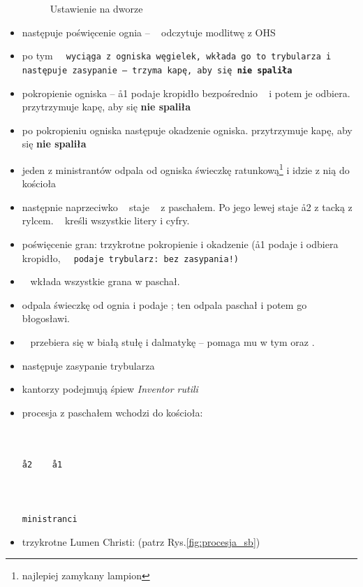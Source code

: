 \begin{itemize}
\begin{figure}[h]
		      \caption{Ustawienie na dworze}
		      \label{fig:ogien}
	      \end{figure}
	\item następuje poświęcenie ognia -- \ii~ odczytuje modlitwę z OHS
	\item po tym \tt~ wyciąga z ogniska węgielek, wkłada go to trybularza i
	      następuje zasypanie --  trzyma kapę, aby się \textbf{nie
		      spaliła}
	\item pokropienie ogniska -- \aa1 podaje kropidło bezpośrednio \ii~ i
	      potem je odbiera.  przytrzymuje kapę, aby się \textbf{nie
		      spaliła}
	\item po pokropieniu ogniska następuje okadzenie ogniska.  przytrzymuje
	      kapę, aby się \textbf{nie spaliła}
	\item jeden z ministrantów odpala od ogniska świeczkę
	      ratunkową\footnote{najlepiej zamykany lampion} i idzie z
	      nią do kościoła
	\item następnie naprzeciwko \ii~ staje \paschal~ z paschałem. Po jego lewej
	      staje \aa2 z tacką z rylcem. \ii~ kreśli wszystkie litery i cyfry.
	\item poświęcenie gran: trzykrotne pokropienie i okadzenie (\aa1 podaje i
	      odbiera kropidło, \tt~ podaje trybularz: bez zasypania!)
	\item \ii~ wkłada wszystkie grana w paschał.
	\item {} odpala świeczkę od ognia i podaje \ii; ten odpala paschał i potem
	      go błogosławi.
	\item \ii~ przebiera się w białą stułę i dalmatykę -- pomaga mu w tym 
	      oraz .
	\item następuje zasypanie trybularza
	\item kantorzy podejmują śpiew \textit{Inventor rutili}
	\item procesja z paschałem wchodzi do kościoła:
	      \begin{center}
		      \uparrow \smallskip\\
		      ~~~\tt \smallskip\\
		      \aa2~~~~\aa1 \smallskip\\
		      \ii \smallskip\\
		      ~~~ \smallskip\\
		      \paschal \smallskip\\
		      ministranci
	      \end{center}
	\item trzykrotne Lumen Christi:  (patrz Rys.\ref{fig:procesja_sb})

\end{itemize}
